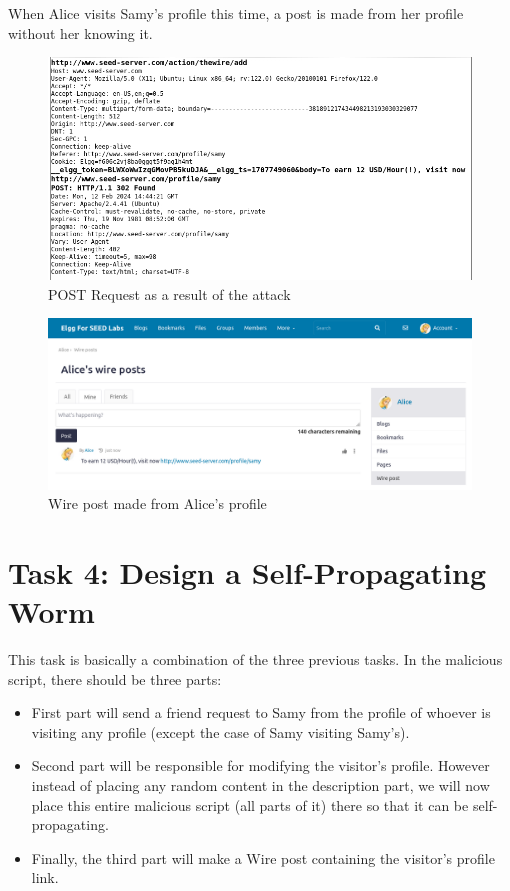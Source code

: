 \documentclass[12pt]{article}
\begin{document}
\newpage
When Alice visits Samy's profile this time, a post is made from her profile without her knowing it.
    \begin{figure}[H]
         \centering
         \includegraphics[width=\textwidth]{Images/ss9.png}
         \caption{POST Request as a result of the attack}
         \label{fig:ss9}
     \end{figure}
    \begin{figure}[H]
         \centering
         \includegraphics[width=\textwidth]{Images/ss5.png}
         \caption{Wire post made from Alice's profile}
         \label{fig:ss5}
     \end{figure}

\newpage

\section*{Task 4: Design a Self-Propagating Worm}
This task is basically a combination of the three previous tasks. In the malicious script, there should be three parts:
\begin{itemize}
 \item First part will send a friend request to Samy from the profile of whoever is visiting any profile (except the case of Samy visiting Samy's).
 \item Second part will be responsible for modifying the visitor's profile. However instead of placing any random content in the description part, we will now place this entire malicious script (all parts of it) there so that it can be self-propagating.
 \item Finally, the third part will make a Wire post containing the visitor's profile link.
\end{itemize}
\end{document}
